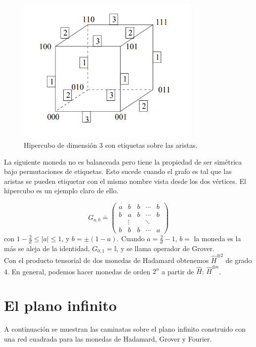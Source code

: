 \begin{figure}[ht]
\centering
\includegraphics[width=0.8\textwidth]{Kap4/HypercubeKempe.png}
\caption{Hipercubo de dimensión $3$ con etiquetas sobre las aristas.}
\end{figure}

La siguiente moneda no es balanceada pero tiene la propiedad de ser simétrica bajo permutaciones de etiquetas. Esto sucede cuando el grafo es tal que las aristas se pueden etiquetar con el mismo nombre vista desde los dos vértices. El hipercubo es un ejemplo claro de ello.

\begin{equation*}
G_{a,b}\doteq
\begin{pmatrix}
a & b & b & \cdots & b\\
b & a & b & \cdots & b\\
 & \vdots & & \ddots & \\
b & b  & b & \cdots & a
\end{pmatrix}
\end{equation*}{}
con $1-\frac{2}{d}\leq|a|\leq 1$, y $b=\pm(1-a)$. Cuando $a=\frac{2}{d}-1$, $b=$ la moneda es la más se aleja de la identidad, $G_{0,1}=\mathbb{I}$, y se llama operador de Grover. \\

Con el producto tensorial de dos monedas de Hadamard obtenemos $\hat{H}^{\otimes 2}$ de grado 4. En general, podemos hacer monedas de orden $2^n$ a partir de $\hat{H}$: $\hat{H}^{\otimes n}$.

\section{El plano infinito}
A continuación se muestran las caminatas sobre el plano infinito construido con una red cuadrada para las monedas de Hadamard, Grover y Fourier. 

